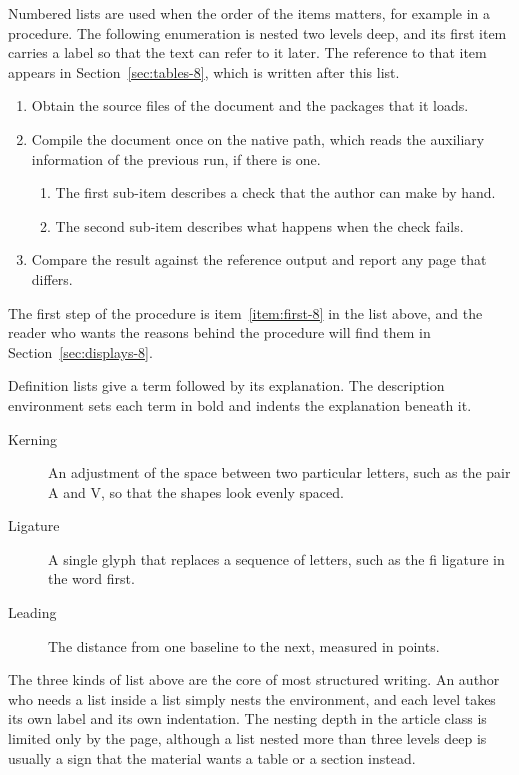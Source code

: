 \documentclass{article}
\begin{document}
Numbered lists are used when the order of the items matters, for example in a
procedure. The following enumeration is nested two levels deep, and its first item
carries a label so that the text can refer to it later. The reference to that item
appears in Section~\ref{sec:tables-8}, which is written after this list.

\begin{enumerate}
  \item\label{item:first-8} Obtain the source files of the document and the packages that
        it loads.
  \item Compile the document once on the native path, which reads the auxiliary
        information of the previous run, if there is one.
        \begin{enumerate}
          \item The first sub-item describes a check that the author can make by hand.
          \item The second sub-item describes what happens when the check fails.
        \end{enumerate}
  \item Compare the result against the reference output and report any page that
        differs.
\end{enumerate}

The first step of the procedure is item~\ref{item:first-8} in the list above, and the
reader who wants the reasons behind the procedure will find them in
Section~\ref{sec:displays-8}.

Definition lists give a term followed by its explanation. The description environment
sets each term in bold and indents the explanation beneath it.

\begin{description}
  \item[Kerning] An adjustment of the space between two particular letters, such as
        the pair A and V, so that the shapes look evenly spaced.
  \item[Ligature] A single glyph that replaces a sequence of letters, such as the
        fi ligature in the word first.
  \item[Leading] The distance from one baseline to the next, measured in points.
\end{description}

The three kinds of list above are the core of most structured writing. An author who
needs a list inside a list simply nests the environment, and each level takes its own
label and its own indentation. The nesting depth in the article class is limited only
by the page, although a list nested more than three levels deep is usually a sign that
the material wants a table or a section instead.
\end{document}
